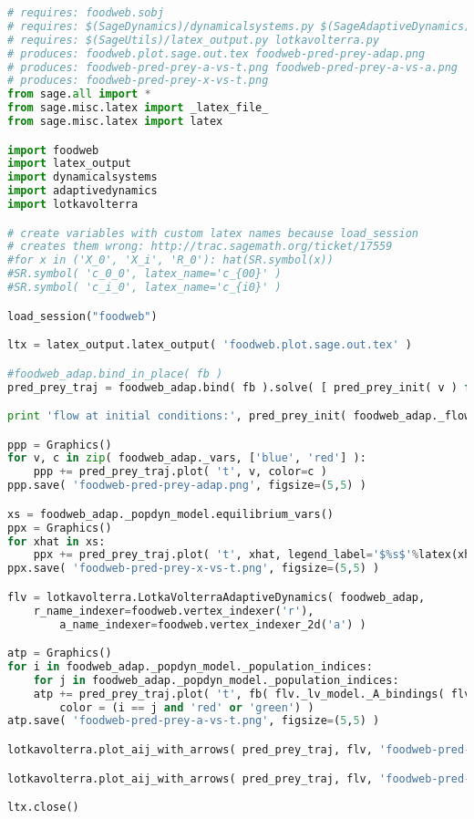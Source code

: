 \begin{lstlisting}[language=Python]
# requires: foodweb.sobj
# requires: $(SageDynamics)/dynamicalsystems.py $(SageAdaptiveDynamics)/adaptivedynamics.py
# requires: $(SageUtils)/latex_output.py lotkavolterra.py
# produces: foodweb.plot.sage.out.tex foodweb-pred-prey-adap.png
# produces: foodweb-pred-prey-a-vs-t.png foodweb-pred-prey-a-vs-a.png
# produces: foodweb-pred-prey-x-vs-t.png
from sage.all import *
from sage.misc.latex import _latex_file_
from sage.misc.latex import latex

import foodweb
import latex_output
import dynamicalsystems
import adaptivedynamics
import lotkavolterra

# create variables with custom latex names because load_session
# creates them wrong: http://trac.sagemath.org/ticket/17559
#for x in ('X_0', 'X_i', 'R_0'): hat(SR.symbol(x))
#SR.symbol( 'c_0_0', latex_name='c_{00}' )
#SR.symbol( 'c_i_0', latex_name='c_{i0}' )

load_session("foodweb")

ltx = latex_output.latex_output( 'foodweb.plot.sage.out.tex' )

#foodweb_adap.bind_in_place( fb )
pred_prey_traj = foodweb_adap.bind( fb ).solve( [ pred_prey_init( v ) for v in foodweb_adap._vars ], end_time=400 ) #, step=0.003 )

print 'flow at initial conditions:', pred_prey_init( foodweb_adap._flow )

ppp = Graphics()
for v, c in zip( foodweb_adap._vars, ['blue', 'red'] ):
    ppp += pred_prey_traj.plot( 't', v, color=c )
ppp.save( 'foodweb-pred-prey-adap.png', figsize=(5,5) )

xs = foodweb_adap._popdyn_model.equilibrium_vars()
ppx = Graphics()
for xhat in xs:
    ppx += pred_prey_traj.plot( 't', xhat, legend_label='$%s$'%latex(xhat) )
ppx.save( 'foodweb-pred-prey-x-vs-t.png', figsize=(5,5) )

flv = lotkavolterra.LotkaVolterraAdaptiveDynamics( foodweb_adap,
	r_name_indexer=foodweb.vertex_indexer('r'),
        a_name_indexer=foodweb.vertex_indexer_2d('a') )

atp = Graphics()
for i in foodweb_adap._popdyn_model._population_indices:
    for j in foodweb_adap._popdyn_model._population_indices:
	atp += pred_prey_traj.plot( 't', fb( flv._lv_model._A_bindings( flv._lv_model._a_indexer[i][j] ) ),
	    color = (i == j and 'red' or 'green') )
atp.save( 'foodweb-pred-prey-a-vs-t.png', figsize=(5,5) )

lotkavolterra.plot_aij_with_arrows( pred_prey_traj, flv, 'foodweb-pred-prey-a-vs-a.png', bindings=fb )

lotkavolterra.plot_aij_with_arrows( pred_prey_traj, flv, 'foodweb-pred-prey-a-vs-a-detail.png', bindings=fb, xmin=-1.9955, xmax=-1.9945, ymin=1.795, ymax=1.796 )

ltx.close()
\end{lstlisting}
